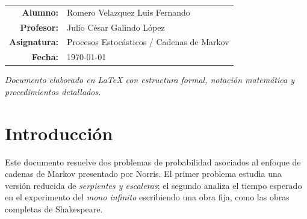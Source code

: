 \documentclass[12pt,a4paper]{article}
\theoremstyle{definition}
\begin{document}
\begin{titlepage}
\vspace{0.65cm}

\begin{center}
\end{center}

\vfill

\begin{flushright}
\renewcommand{\baselinestretch}{1.13}
\begin{tabular}{rl}
\textbf{\textcolor{azulNorris}{Alumno:}} & Romero Velazquez Luis Fernando \\[1mm]
\textbf{\textcolor{azulNorris}{Profesor:}} & Julio César Galindo López \\[1mm]
\textbf{\textcolor{azulNorris}{Asignatura:}} & Procesos Estocásticos / Cadenas de Markov \\[1mm]
\textbf{\textcolor{azulNorris}{Fecha:}} & \today
\end{tabular}
\end{flushright}

\vspace{0.45cm}
\begin{center}
{\footnotesize\textit{Documento elaborado en \LaTeX{} con estructura formal, notación matemática y procedimientos detallados.}}
\end{center}
\end{titlepage}

\tableofcontents
\newpage
{}

\section{Introducción}

Este documento resuelve dos problemas de probabilidad asociados al enfoque de cadenas de Markov presentado por Norris. El primer problema estudia una versión reducida de \textit{serpientes y escaleras}; el segundo analiza el tiempo esperado en el experimento del \textit{mono infinito} escribiendo una obra fija, como las obras completas de Shakespeare.
\end{document}
